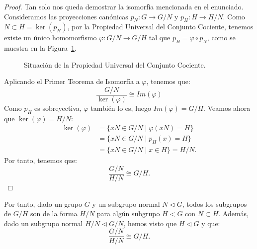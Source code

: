 \begin{ejercicio}
\begin{teo}
\begin{proof}
            Tan solo nos queda demostrar la isomorfía mencionada en el enunciado. Consideramos las proyecciones canónicas \(p_N: G \to G/N\) y \(p_H: H \to H/N\). Como $N\subset H=\ker(p_H)$, por la Propiedad Universal del Conjunto Cociente, tenemos existe un único homomorfismo $\varphi: G/N \to G/H$ tal que \(p_H = \varphi \circ p_N\), como se muestra en la Figura~\ref{fig:teo_propiedad_universal}.
            \begin{figure}[h]
                \centering
                \caption{Situación de la Propiedad Universal del Conjunto Cociente.}
                \label{fig:teo_propiedad_universal}
            \end{figure}
            
            
            Aplicando el Primer Teorema de Isomorfía a $\varphi$, tenemos que:
            \begin{equation*}
                \frac{G/N}{\ker(\varphi)} \cong Im(\varphi)
            \end{equation*}
            Como $p_H$ es sobreyectiva, $\varphi$ también lo es, luego $Im(\varphi)=G/H$. Veamos ahora que $\ker(\varphi) = H/N$:
            \begin{align*}
                \ker(\varphi) &= \{xN\in G/N \mid \varphi(xN) = H\} \\
                &= \{xN\in G/N \mid p_H(x) = H\} \\
                &= \{xN\in G/N \mid x\in H\} = H/N.
            \end{align*}
            Por tanto, tenemos que:
            \begin{equation*}
                \frac{G/N}{H/N} \cong G/H.
            \end{equation*}
        \end{proof}
    \end{teo}

    Por tanto, dado un grupo \(G\) y un subgrupo normal \(N\lhd G\), todos los subgrupos de $G/H$ son de la forma \(H/N\) para algún subgrupo \(H<G\) con $N\subset H$. Además, dado un subgrupo normal $H/N \lhd G/N$, hemos visto que \(H\lhd G\) y que:
    \begin{equation*}
        \frac{G/N}{H/N} \cong G/H.
    \end{equation*}
\end{ejercicio}

